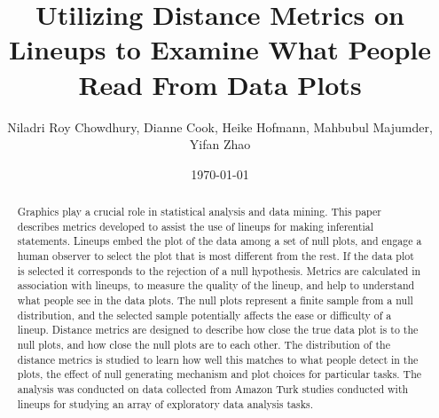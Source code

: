 \documentclass[12]{article}
\begin{document}
\title{Utilizing Distance Metrics on Lineups to Examine What People Read From Data Plots}
\author{Niladri Roy Chowdhury, Dianne Cook, Heike Hofmann, Mahbubul Majumder, Yifan Zhao}
\date{\today}  %
\maketitle

\begin {abstract} 
Graphics play a crucial role in statistical analysis and data mining. This paper describes metrics developed to assist the use of lineups for making inferential statements. Lineups embed the plot of the data among a set of null plots, and engage a human observer to select the plot that is most different from the rest. If the data plot is selected it corresponds to the rejection of a null hypothesis. Metrics are calculated in association with lineups, to measure the quality of the lineup, and help to understand what people see in the data plots.  The null plots represent a finite sample from a null distribution, and the selected sample potentially affects the ease or difficulty of a lineup. Distance metrics are designed to describe how close the true data plot is to the null plots, and how close the null plots are to each other. The distribution of the distance metrics is studied to learn how well this matches to what people detect in the plots, the effect of null generating mechanism and plot choices for particular tasks.  The analysis was conducted on data collected from Amazon Turk studies conducted with lineups for studying an array of exploratory data analysis tasks.

\end {abstract}
\end{document}
